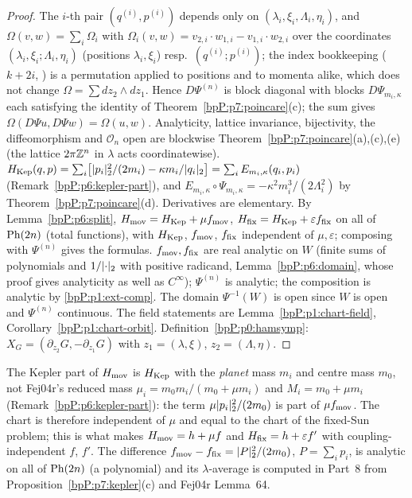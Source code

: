 \begin{proof}
\label{stepP:p7:pc-prod} The $i$-th pair $(q^{(i)},p^{(i)})$ depends only on $(\lambda_i,\xi_i,\Lambda_i,\eta_i)$, and $\Omega(v,w)=\sum_i\Omega_i$ with $\Omega_i(v,w)=v_{2,i}\cdot w_{1,i}-v_{1,i}\cdot w_{2,i}$ over the coordinates $(\lambda_i,\xi_i;\Lambda_i,\eta_i)$ (positions $\lambda_i,\xi_i$) resp.\ $(q^{(i)};p^{(i)})$; the index bookkeeping ($k+2i$, ) is a permutation applied to positions and to momenta alike, which does not change $\Omega=\sum dz_2\wedge dz_1$. Hence $D\Psi^{(n)}$ is block diagonal with blocks $D\Psi_{m_i,\kappa}$ each satisfying the identity of Theorem~\ref{bpP:p7:poincare}(c); the sum gives $\Omega(D\Psi u,D\Psi w)=\Omega(u,w)$. Analyticity, lattice invariance, bijectivity, the diffeomorphism and $\mathcal O_n$ open are blockwise Theorem~\ref{bpP:p7:poincare}(a),(c),(e) (the lattice $2\pi\mathbb{Z}^n$ in $\lambda$ acts coordinatewise).
\label{stepP:p7:pc-dec} $H_{\rm Kep}(q,p)=\sum_i\bigl[\lvert p_i\rvert_2^2/(2m_i)-\kappa m_i/\lvert q_i\rvert_2\bigr]=\sum_iE_{m_i,\kappa}(q_i,p_i)$ (Remark~\ref{bpP:p6:kepler-part}), and $E_{m_i,\kappa}\circ\Psi_{m_i,\kappa}=-\kappa^2m_i^3/(2\Lambda_i^2)$ by Theorem~\ref{bpP:p7:poincare}(d). Derivatives are elementary.
\label{stepP:p7:pc-share} By Lemma~\ref{bpP:p6:split}, $H_{\rm mov}=H_{\rm Kep}+\mu f_{\rm mov}$, $H_{\rm fix}=H_{\rm Kep}+\varepsilon f_{\rm fix}$ on all of $\mathrm{Ph}(2n)$ (total functions), with $H_{\rm Kep}$, $f_{\rm mov}$, $f_{\rm fix}$ independent of $\mu,\varepsilon$; composing with $\Psi^{(n)}$ gives the formulas. $f_{\rm mov},f_{\rm fix}$ are real analytic on $W$ (finite sums of polynomials and $1/\lvert \cdot\rvert_2$ with positive radicand, Lemma~\ref{bpP:p6:domain}, whose proof gives analyticity as well as $C^\infty$); $\Psi^{(n)}$ is analytic; the composition is analytic by \ref{bpP:p1:ext-comp}. The domain $\Psi^{-1}(W)$ is open since $W$ is open and $\Psi^{(n)}$ continuous. The field statements are Lemma~\ref{bpP:p1:chart-field}, Corollary~\ref{bpP:p1:chart-orbit}.
\label{stepP:p7:pc-eq} Definition~\ref{bpP:p0:hamsymp}: $X_G=(\partial_{z_2}G,-\partial_{z_1}G)$ with $z_1=(\lambda,\xi)$, $z_2=(\Lambda,\eta)$.
\end{proof}

\begin{remark}\label{bpP:p7:same-chart}
The Kepler part of $H_{\rm mov}$ is $H_{\rm Kep}$ with the \emph{planet} mass $m_i$ and centre mass $m_0$, not Fej04r's reduced mass $\mu_i=m_0m_i/(m_0+\mu m_i)$ and $M_i=m_0+\mu m_i$ (Remark~\ref{bpP:p6:kepler-part}): the term $\mu\lvert p_i\rvert_2^2/(2m_0)$ is part of $\mu f_{\rm mov}$. The chart is therefore independent of $\mu$ and equal to the chart of the fixed-Sun problem; this is what makes $H_{\rm mov}=h+\mu f$ and $H_{\rm fix}=h+\varepsilon f'$ with coupling-independent $f$, $f'$. The difference $f_{\rm mov}-f_{\rm fix}=\lvert P\rvert_2^2/(2m_0)$, $P=\sum_ip_i$, is analytic on all of $\mathrm{Ph}(2n)$ (a polynomial) and its $\lambda$-average is computed in Part~8 from Proposition~\ref{bpP:p7:kepler}(c) and Fej04r Lemma~64.
\end{remark}

